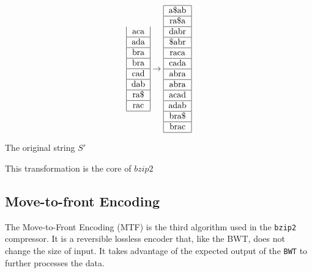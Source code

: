 \documentclass{article}
\begin{document}
\begin{equation*}
\begin{tabular}{|c|}
        aca \\ \hline
        ada \\ \hline
        bra \\ \hline
        bra \\ \hline
        cad \\ \hline
        dab \\ \hline
        ra\$ \\ \hline
        rac \\ \hline
    \end{tabular}
    \rightarrow
    \begin{tabular}{|c|}\hline
        a\$ab \\ \hline
        ra\$a \\ \hline
        dabr \\ \hline
        \$abr \\ \hline
        raca \\ \hline
        cada \\ \hline
        abra \\ \hline
        abra \\ \hline
        acad \\ \hline
        adab \\ \hline
        bra\$ \\ \hline
        brac \\ \hline
    \end{tabular}
\end{equation*}


The original string \(S'\)


This transformation is the core of \(bzip2\)

\subsection{Move-to-front Encoding}
The Move-to-Front Encoding (MTF) is the third algorithm used in the \texttt{bzip2} compressor. It is a reversible lossless encoder that, like the BWT, does not change the size of input. It takes advantage of the expected output of the \texttt{BWT} to further processes the data.
\end{document}
